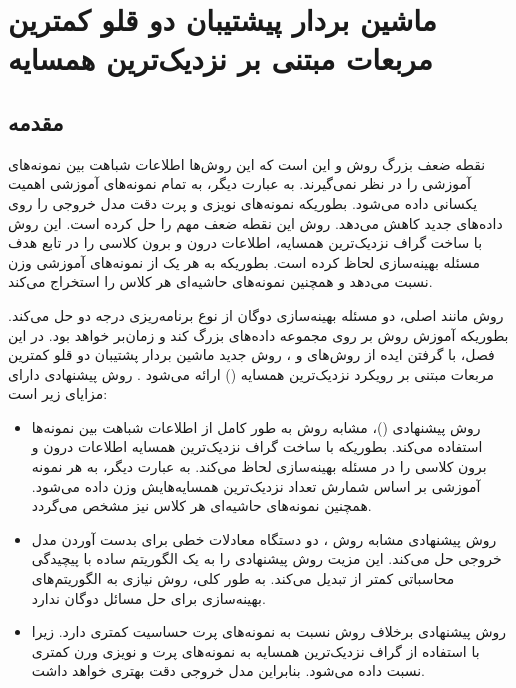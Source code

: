 
\chapter{ماشین بردار پیشتیبان دو قلو کمترین مربعات مبتنی بر نزدیک‌ترین همسایه }\label{ch:3}
\section{مقدمه}\label{sec:3:1}
نقطه ضعف بزرگ روش  و  این است که این روش‌ها اطلاعات شباهت  بین نمونه‌های آموزشی را در نظر نمی‌گیرند. به عبارت دیگر، به تمام نمونه‌های آموزشی اهمیت یکسانی داده می‌شود. بطوریکه نمونه‌های نویزی و پرت دقت مدل خروجی را روی داده‌های جدید کاهش می‌دهد. روش  این نقطه ضعف مهم را حل کرده است. این روش با ساخت گراف نزدیک‌ترین همسایه، اطلاعات درون و برون کلاسی را در تابع هدف مسئله بهینه‌سازی لحاظ کرده است. بطوریکه به هر یک از نمونه‌های آموزشی وزن نسبت می‌دهد و همچنین نمونه‌های حاشیه‌ای هر کلاس را استخراج می‌کند.

روش  مانند  اصلی، دو مسئله بهینه‌سازی دوگان از نوع برنامه‌ریزی درجه دو حل می‌کند. بطوریکه آموزش روش  بر روی مجموعه داده‌های بزرگ کند و زمان‌بر خواهد بود. در این فصل، با گرفتن ایده از روش‌های  و ، روش جدید ماشین بردار پشتیبان دو قلو کمترین مربعات مبتنی بر رویکرد نزدیک‌ترین همسایه () ارائه می‌شود \cite{mir2018}. روش پیشنهادی دارای مزایای زیر است:

\begin{itemize}[label=$\bullet$]
	\item روش پیشنهادی ()، مشابه روش  به طور کامل از اطلاعات شباهت بین نمونه‌ها استفاده می‌کند. بطوریکه با ساخت گراف نزدیک‌ترین همسایه اطلاعات درون و برون کلاسی را در مسئله بهینه‌سازی لحاظ می‌کند. به عبارت دیگر، به هر نمونه آموزشی بر اساس شمارش تعداد نزدیک‌ترین همسایه‌هایش وزن داده می‌شود. همچنین نمونه‌های حاشیه‌ای هر کلاس نیز مشخص می‌گردد.
	\item روش پیشنهادی مشابه روش ، دو دستگاه معادلات خطی برای بدست آوردن مدل خروجی حل می‌کند. این مزیت روش پیشنهادی را به یک الگوریتم ساده با پیچیدگی محاسباتی کمتر از  تبدیل می‌کند. به طور کلی، روش  نیازی به الگوریتم‌های بهینه‌سازی برای حل مسائل دوگان ندارد.
	\item روش پیشنهادی برخلاف روش  نسبت به نمونه‌های پرت حساسیت کمتری دارد. زیرا با استفاده از گراف نزدیک‌ترین همسایه به نمونه‌های پرت و نویزی ورن کمتری نسبت داده می‌شود. بنابراین مدل خروجی دقت بهتری خواهد داشت.
\end{itemize}


